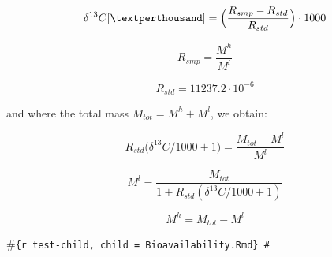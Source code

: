 \documentclass[]{article}
\begin{document}
\begin{equation} 
\delta ^{13}C [\textperthousand] = \Big(\frac{R_{smp} - R_{std}}{R_{std}}\Big)\cdot 1000
\end{equation}

\begin{equation} 
R_{smp} = \frac{M^h}{M^l} 
\end{equation}

\begin{equation} 
R_{std} = 11237.2 \cdot 10^{-6}
\end{equation}

and where the total mass \(M_{tot} = M^h + M^l\), we obtain:

\begin{equation} 
R_{std}\Big(\delta ^{13}C/1000+1 \Big)= \frac{M_{tot}-M^l}{M^l}
\end{equation}

\begin{equation} 
M^l = \frac{M_{tot}}{1+R_{std}(\delta ^{13}C/1000+1)}
\end{equation}

\begin{equation} 
M^h = M_{tot} - M^l 
\end{equation}

\#\texttt{\{r\ test-child,\ child\ =\ \textquotesingle{}Bioavailability.Rmd\textquotesingle{}\}\ \#}

\renewcommand\refname{References}

\end{document}
